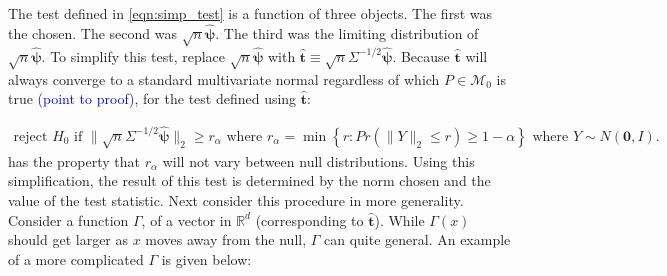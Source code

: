 \documentclass{article}
\newcommand{\disto}{P}
\newcommand{\tst}{\hat{\boldsymbol{t}}}
\newcommand{\rvt}{Y}
\newcommand{\distv}{Q}
\begin{document}

The test defined in \eqref{eqn:simp_test} is a function of three objects. The first was the chosen.  The second was $\sqrt{n}\hat{\boldsymbol{\psi}}$.  The third was the limiting distribution of $\sqrt{n}\hat{\boldsymbol{\psi}}$.  To simplify this test, replace  $\sqrt{n}\hat{\boldsymbol{\psi}}$ with $ \tst \equiv \sqrt{n}\Sigma^{-1/2}\hat{\boldsymbol{\psi}}$. Because $\tst$ will always converge to a standard multivariate normal regardless of which $P \in \mathscr{M}_0$ is true \textcolor{blue}{(point to proof)}, for the test defined using $\tst$: 

\begin{align}
\label{eqn:simp_test_simp}
		\text{reject } H_0 \text{ if } \|\sqrt{n}\Sigma^{-1/2} \hat{\boldsymbol{\psi}}\|_2 \geq r_\alpha \text{ where } r_\alpha = \min\left\{r : Pr(\|\rvt\|_2 \leq r) \geq 1 - \alpha \right\} \text{ where } \rvt \sim N(\boldsymbol{0}, I).
\end{align}
has the property that $r_\alpha$ will not vary between null distributions. Using this simplification, the result of this test is determined by the norm chosen and the value of the test statistic.  Next consider this procedure in more generality. 
Consider a function $\Gamma$, of a vector in $\mathbb{R}^d$ (corresponding to $\tst$). While $\Gamma(x)$ should get larger as $x$ moves away from the null, $\Gamma$ can quite general.
An example of a more complicated $\Gamma$ is given below:
\end{document}
